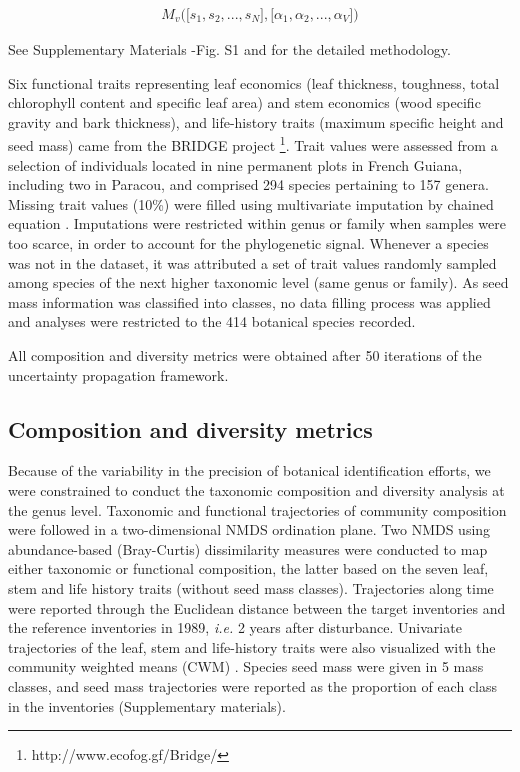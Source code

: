 \documentclass[fleqn,10pt]{ArtEcoFoG} %
\begin{document}
\begin{align}
M_v\Big(\big[s_1, s_2,..., s_N\big],\big[\alpha_1, \alpha_2,..., \alpha_V\big]\Big) \nonumber
\end{align}

See Supplementary Materials -Fig. S1 and \citet{Aubry-Kientz2013} for
the detailed methodology.

Six functional traits representing leaf economics (leaf thickness,
toughness, total chlorophyll content and specific leaf area) and stem
economics (wood specific gravity and bark thickness), and life-history
traits (maximum specific height and seed mass) came from the BRIDGE
project \footnote{http://www.ecofog.gf/Bridge/}. Trait values were
assessed from a selection of individuals located in nine permanent plots
in French Guiana, including two in Paracou, and comprised 294 species
pertaining to 157 genera. Missing trait values (10\%) were filled using
multivariate imputation by chained equation \citep{Mice2011}.
Imputations were restricted within genus or family when samples were too
scarce, in order to account for the phylogenetic signal. Whenever a
species was not in the dataset, it was attributed a set of trait values
randomly sampled among species of the next higher taxonomic level (same
genus or family). As seed mass information was classified into classes,
no data filling process was applied and analyses were restricted to the
414 botanical species recorded.

All composition and diversity metrics were obtained after 50 iterations
of the uncertainty propagation framework.

\subsection{Composition and diversity
metrics}\label{composition-and-diversity-metrics}

Because of the variability in the precision of botanical identification
efforts, we were constrained to conduct the taxonomic composition and
diversity analysis at the genus level. Taxonomic and functional
trajectories of community composition were followed in a two-dimensional
NMDS ordination plane. Two NMDS using abundance-based (Bray-Curtis)
dissimilarity measures were conducted to map either taxonomic or
functional composition, the latter based on the seven leaf, stem and
life history traits (without seed mass classes). Trajectories along time
were reported through the Euclidean distance between the target
inventories and the reference inventories in 1989, \emph{i.e.} 2 years
after disturbance. Univariate trajectories of the leaf, stem and
life-history traits were also visualized with the community weighted
means (CWM) \citep{Diaz2007}. Species seed mass were given in 5 mass
classes, and seed mass trajectories were reported as the proportion of
each class in the inventories (Supplementary materials).
\end{document}

